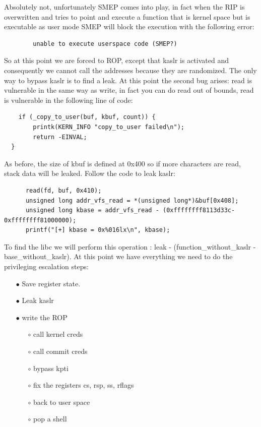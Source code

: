     Absolutely not, unfortunately SMEP comes into play, in fact when the RIP is overwritten and tries to point and execute a function that is kernel space but is executable as user mode SMEP will block the execution with the following error:
    \begin{verbatim}
        unable to execute userspace code (SMEP?)
    \end{verbatim}
    So at this point we are forced to ROP, except that kaslr is activated and consequently we cannot call the addresses because they are randomized.\newline
    The only way to bypass kaslr is to find a leak.\newline
    At this point the second bug arises: read is vulnerable in the same way as write, in fact you can do read out of bounds, read is vulnerable in the following line of code:\newline
    \begin{verbatim}
    if (_copy_to_user(buf, kbuf, count)) {
        printk(KERN_INFO "copy_to_user failed\n");
        return -EINVAL;
  }
    \end{verbatim}
   As before, the size of kbuf is defined at 0x400 so if more characters are read, stack data will be leaked.\newline 
   Follow the code to leak kaslr:\newline
   \begin{verbatim}
      read(fd, buf, 0x410);
      unsigned long addr_vfs_read = *(unsigned long*)&buf[0x408];
      unsigned long kbase = addr_vfs_read - (0xffffffff8113d33c-0xffffffff81000000);
      printf("[+] kbase = 0x%016lx\n", kbase);
   \end{verbatim}
   To find the libc we will perform this operation : leak - (function\_without\_kaslr - base\_without\_kaslr).\newline
   At this point we have everything we need to do the privileging escalation steps:\newline
    \begin{itemize}
        \item[$\bullet$] Save register state.
        \item[$\bullet$] Leak kaslr  
        \item[$\bullet$] write the ROP   
        \begin{itemize}
            \item[$\circ$] call kernel creds
            \item[$\circ$] call commit creds
            \item[$\circ$] bypass kpti
            \item[$\circ$] fix the registers cs, rsp, ss, rflags
            \item[$\circ$] back to user space 
            \item[$\circ$] pop a shell 
        \end{itemize}
    \end{itemize}
